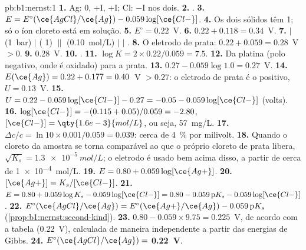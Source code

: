 \begin{solution}{pb:b1:nernst:1}
\textbf{1.} Ag: 0, $+$I, $+$I; Cl: $-$I nos dois.
\textbf{2.} .
\textbf{3.} $E = E^\circ(\ce{AgCl}/\ce{Ag}) - 0.059\log[\ce{Cl-}]$.
\textbf{4.} Os dois sólidos têm  1; só o íon cloreto está em
solução.
\textbf{5.} $E^\circ = 0.22$~V.
\textbf{6.} $0.22 + 0.118 = 0.34$~V.
\textbf{7.}  $|$  (\qty{1}{bar}) $|$  ( 1)
$\|$  (\qty{0.10}{mol/L}) $|$  $|$ .
\textbf{8.} O eletrodo de prata: $0.22 + 0.059 = 0.28$~V $> 0$.
\textbf{9.} $0.28$~V.
\textbf{10.} .
\textbf{11.} $\log K = 2 \times 0.22/0.059 = 7.5$.
\textbf{12.} Da platina (polo negativo, onde  é oxidado) para a
prata.
\textbf{13.} $0.27 - 0.059\log 1.0 = 0.27$~V.
\textbf{14.} $E(\ce{Ag}) = 0.22 + 0.177 = 0.40$~V $> 0.27$: o eletrodo de
prata é o positivo, $U = 0.13$~V.
\textbf{15.} $U = 0.22 - 0.059\log[\ce{Cl-}] - 0.27 = -0.05 -
0.059\log[\ce{Cl-}]$ (volts).
\textbf{16.} $\log[\ce{Cl-}] = -(0.115 + 0.05)/0.059 = -2.80$,
$[\ce{Cl-}] = \qty{1.6e-3}{mol/L}$, ou seja, \qty{57}{mg/L}.
\textbf{17.} $\Delta c/c = \ln 10 \times 0.001/0.059 = 0.039$: cerca de
\qty{4}{\percent} por milivolt.
\textbf{18.} Quando o cloreto da amostra se torna comparável ao que o
próprio cloreto de prata libera, $\sqrt{K_s} = \qty{1.3e-5}{mol/L}$; o
eletrodo é usado bem acima disso, a partir de cerca de \qty{1e-4}{mol/L}.
\textbf{19.} $E = 0.80 + 0.059\log[\ce{Ag+}]$.
\textbf{20.} $[\ce{Ag+}] = K_s/[\ce{Cl-}]$.
\textbf{21.} $E = 0.80 + 0.059\log K_s - 0.059\log[\ce{Cl-}] = 0.80 -
0.059\,\mathrm{p}K_s - 0.059\log[\ce{Cl-}]$.
\textbf{22.} $E^\circ(\ce{AgCl}/\ce{Ag}) = E^\circ(\ce{Ag+}/\ce{Ag}) -
0.059\,\mathrm{p}K_s$ (\cref{prop:b1:nernst:second-kind}).
\textbf{23.} $0.80 - 0.059 \times 9.75 = 0.225$~V, de acordo com a
tabela (0.22~V), calculada de maneira independente a partir das
energias de Gibbs.
\textbf{24.} $E^\circ(\ce{AgCl}/\ce{Ag}) = $ \textbf{0.22~V}.
\end{solution}
